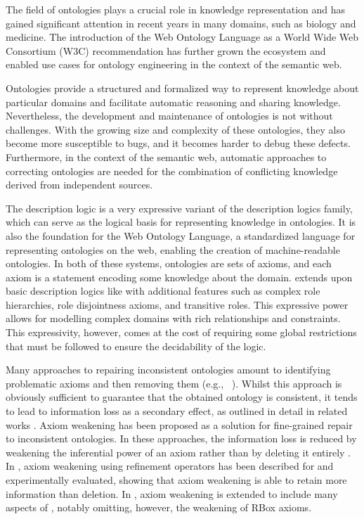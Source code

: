 
The field of ontologies plays a crucial role in knowledge representation and has gained significant attention in recent years in many domains, such as biology and medicine. The introduction of the Web Ontology Language as a World Wide Web Consortium (W3C) recommendation has further grown the ecosystem and enabled use cases for ontology engineering in the context of the semantic web.

Ontologies provide a structured and formalized way to represent knowledge about particular domains and facilitate automatic reasoning and sharing knowledge. Nevertheless, the development and maintenance of ontologies is not without challenges. With the growing size and complexity of these ontologies, they also become more susceptible to bugs, and it becomes harder to debug these defects. Furthermore, in the context of the semantic web, automatic approaches to correcting ontologies are needed for the combination of conflicting knowledge derived from independent sources.

The \SROIQ description logic is a very expressive variant of the description logics family, which can serve as the logical basis for representing knowledge in ontologies. It is also the foundation for the Web Ontology Language, a standardized language for representing ontologies on the web, enabling the creation of machine-readable ontologies. In both of these systems, ontologies are sets of axioms, and each axiom is a statement encoding some knowledge about the domain. \SROIQ extends upon basic description logics like \ALC with additional features such as complex role hierarchies, role disjointness axioms, and transitive roles. This expressive power allows for modelling complex domains with rich relationships and constraints. This expressivity, however, comes at the cost of requiring some global restrictions that must be followed to ensure the decidability of the logic.

Many approaches to repairing inconsistent ontologies amount to identifying problematic axioms and then removing them (e.g., ~\cite{schlobach2003non,kalyanpur2005debugging,kalyanpur2006repairing,BaPS07}). Whilst this approach is obviously sufficient to guarantee that the obtained ontology is consistent, it tends to lead to information loss as a secondary effect, as outlined in detail in related works \cite{troquard2018repairing,confalonieri2020towards}. 
Axiom weakening has been proposed as a solution for fine-grained repair to inconsistent ontologies. In these approaches, the information loss is reduced by weakening the inferential power of an axiom rather than by deleting it entirely \cite{du2014practical,AMAI-2018,baader2018making,troquard2018repairing,confalonieri2020towards}. 
%
In \cite{troquard2018repairing}, axiom weakening using refinement operators has been described for \ALC and experimentally evaluated, showing that axiom weakening is able to retain more information than deletion. In \cite{confalonieri2020towards}, axiom weakening is extended to include many aspects of \SROIQ, notably omitting, however, the weakening of RBox axioms.

